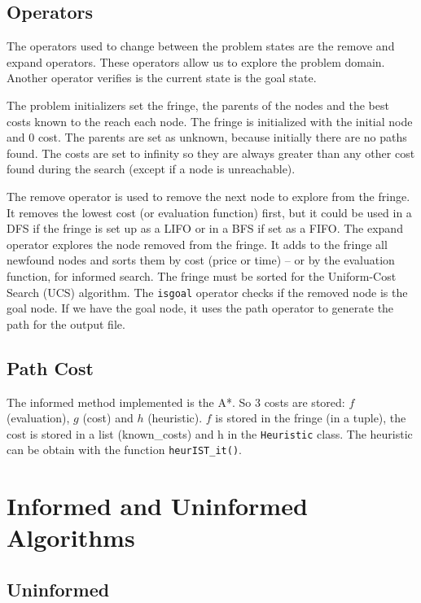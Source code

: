 \documentclass[a4paper]{article}
\begin{document}
    \subsection{Operators}
    
    The operators used to change between the problem states are the remove and expand operators. These operators allow us to explore the  problem domain. Another operator verifies is the current state is the goal state.
    
    The problem initializers set the fringe, the parents of the nodes and the best costs known to the reach each node. The fringe is initialized with the initial node and 0 cost. The parents are set as unknown, because initially there are no paths found. The costs are set to infinity so they are always greater than any other cost found during the search (except if a node is unreachable).
    
    The remove operator is used to remove the next node to explore from the fringe. It removes the lowest cost (or evaluation function) first, but it could be used in a DFS if the fringe is set up as a LIFO or in a BFS if set as a FIFO.
    The expand operator explores the node removed from the fringe. It adds to the fringe all newfound nodes and sorts them by cost (price or time) -- or by the evaluation function, for informed search. The fringe must be sorted for the Uniform-Cost Search (UCS) algorithm.
    The \texttt{isgoal} operator checks if the removed node is the goal node. If we have the goal node, it uses the path operator to generate the path for the output file.
    
    \subsection{Path Cost}
    The informed method implemented is the A*. So 3 costs are stored: $f$ (evaluation), $g$ (cost) and $h$ (heuristic). $f$ is stored in the fringe (in a tuple), the cost is stored in a list (known\_costs) and h in the \texttt{Heuristic} class. The heuristic can be obtain with the function \texttt{heurIST\_it()}.
    
    \section{Informed and Uninformed Algorithms}
    
    \subsection{Uninformed}
    
\end{document}
